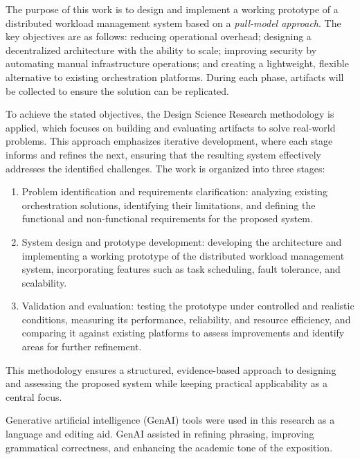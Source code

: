The purpose of this work is to design and implement a working prototype of a distributed workload management system based on a \textit{pull-model approach}. The key objectives are as follows: reducing operational overhead; designing a decentralized architecture with the ability to scale; improving security by automating manual infrastructure operations; and creating a lightweight, flexible alternative to existing orchestration platforms. During each phase, artifacts will be collected to ensure the solution can be replicated.

To achieve the stated objectives, the Design Science Research \cite{dresch2014design} methodology is applied, which focuses on building and evaluating artifacts to solve real-world problems. This approach emphasizes iterative development, where each stage informs and refines the next, ensuring that the resulting system effectively addresses the identified challenges. The work is organized into three stages:

\begin{enumerate}
\item Problem identification and requirements clarification: analyzing existing orchestration solutions, identifying their limitations, and defining the functional and non-functional requirements for the proposed system.
\item System design and prototype development: developing the architecture and implementing a working prototype of the distributed workload management system, incorporating features such as task scheduling, fault tolerance, and scalability.
\item Validation and evaluation: testing the prototype under controlled and realistic conditions, measuring its performance, reliability, and resource efficiency, and comparing it against existing platforms to assess improvements and identify areas for further refinement.
\end{enumerate}

This methodology ensures a structured, evidence-based approach to designing and assessing the proposed system while keeping practical applicability as a central focus.

Generative artificial intelligence (GenAI) tools were used in this research as a language and editing aid. GenAI assisted in refining phrasing, improving grammatical correctness, and enhancing the academic tone of the exposition.

